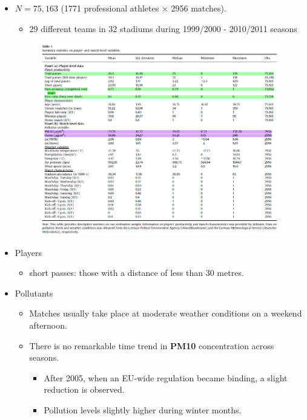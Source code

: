 \documentclass[../root]{subfiles}
\begin{document}
    \begin{itemize}
      \item $N = 75,163$ (1771 professional athletes $\times$ 2956 matches).
      \begin{itemize}
        \item 29 different teams in 32 stadiums during 1999/2000 - 2010/2011 seasons
      \end{itemize}
      \begin{figure}
        \centering
        \includegraphics[scale = 1]{0522tanji/t1}
        \label{t1}
      \end{figure}
      \item Players
      \begin{itemize}
        \item short passes: those with a distance of less than 30 metres.
      \end{itemize}
      \item Pollutants
      \begin{itemize}
        \item Matches usually take place at moderate weather conditions on a weekend afternoon.
        \item There is no remarkable time trend in \textbf{PM10} concentration across seasons.
        \begin{itemize}
          \item After 2005, when an EU-wide regulation became binding, a slight reduction is observed.
          \item Pollution levels slightly higher during winter months.

\end{itemize}
\end{itemize}
\end{itemize}
\end{document}
